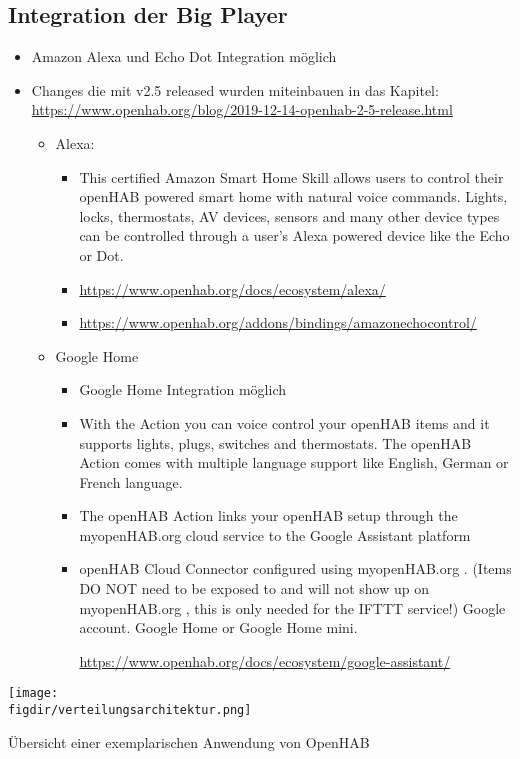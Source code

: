\subsection{Integration der Big Player}
\begin{itemize}
	\item Amazon Alexa und Echo Dot Integration möglich
	\item Changes die mit v2.5 released wurden miteinbauen in das Kapitel:
	\url{https://www.openhab.org/blog/2019-12-14-openhab-2-5-release.html}
	\begin{itemize}
		\item Alexa:
		\begin{itemize}
			\item This certified Amazon Smart Home Skill allows users to control their openHAB powered smart home with natural voice commands. Lights, locks, thermostats, AV devices, sensors and many other device types can be controlled through a user's Alexa powered device like the Echo or Dot.
			\item \url{https://www.openhab.org/docs/ecosystem/alexa/}
			\item \url{https://www.openhab.org/addons/bindings/amazonechocontrol/}
		\end{itemize} 
		\item Google Home
		\begin{itemize}
			\item Google Home Integration möglich
			\item With the Action you can voice control your openHAB items and it supports lights, plugs, switches and thermostats. The openHAB Action comes with multiple language support like English, German or French language.
			\item The openHAB Action links your openHAB setup through the myopenHAB.org cloud service to the Google Assistant platform
			\item openHAB Cloud Connector configured using myopenHAB.org . (Items DO NOT need to be exposed to and will not show up on myopenHAB.org
			, this is only needed for the IFTTT service!)
			Google account.
			Google Home or Google Home mini.
			
			\url{https://www.openhab.org/docs/ecosystem/google-assistant/}
		\end{itemize} 
	\end{itemize}
	
\end{itemize}
\begin{minipage}{\textwidth}
	\centering
	\captionsetup{type=figure}
	\texttt{[image: \\figdir/verteilungsarchitektur.png]}
	\caption{Übersicht einer exemplarischen Anwendung von OpenHAB \label{fig:verteilungs-architektur}}
\end{minipage}

